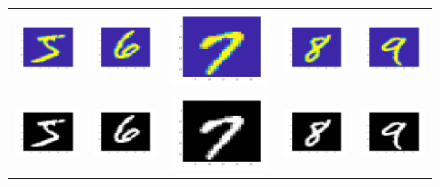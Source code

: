 \documentclass{article} %
\begin{document}
\begin{figure}[H]
\begin{tabular}{ccccc}
\\
\includegraphics[width=0.15\linewidth]{images/5.png}
&
\includegraphics[width=0.15\linewidth]{images/6.png}
&
\includegraphics[width=0.15\linewidth]{images/7.png}
&
\includegraphics[width=0.15\linewidth]{images/8.png}
&
\includegraphics[width=0.15\linewidth]{images/9.png}
\\
\includegraphics[width=0.15\linewidth]{images/5_gray.png}
&
\includegraphics[width=0.15\linewidth]{images/6_gray.png}
&
\includegraphics[width=0.15\linewidth]{images/7_gray.png}
&
\includegraphics[width=0.15\linewidth]{images/8_gray.png}
&
\includegraphics[width=0.15\linewidth]{images/9_gray.png}
\end{tabular}
\end{figure}
\end{document}
